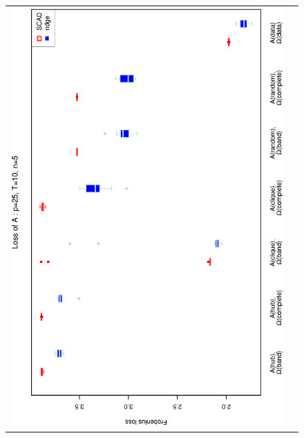 \documentclass[a4paper]{article}
\begin{document}
\begin{figure}[h!]
\centering
\begin{tabular}{cc}
\includegraphics[scale=0.45,angle=270]{LossA25T10N5_25.eps}
\\

\end{tabular}
\end{figure}
\end{document}
